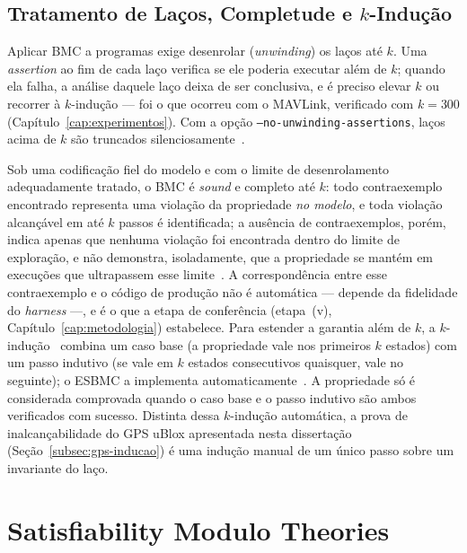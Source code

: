 \subsection{Tratamento de Laços, Completude e $k$-Indução}

Aplicar BMC a programas exige desenrolar (\textit{unwinding}) os laços até $k$.
Uma \textit{assertion} ao fim de cada laço verifica se ele poderia executar além
de $k$; quando ela falha, a análise daquele laço deixa de ser conclusiva, e é
preciso elevar $k$ ou recorrer à $k$-indução --- foi o que ocorreu com o MAVLink,
verificado com $k = 300$ (Capítulo~\ref{cap:experimentos}). Com a opção
\texttt{--no-unwinding-assertions}, laços acima de $k$ são truncados
silenciosamente~\cite{Gadelha2017}.

Sob uma codificação fiel do modelo e com o limite de desenrolamento adequadamente
tratado, o BMC é \textit{sound} e completo até $k$: todo contraexemplo encontrado
representa uma violação da propriedade \emph{no modelo}, e toda violação alcançável
em até $k$ passos é identificada; a ausência de contraexemplos, porém, indica
apenas que nenhuma violação
foi encontrada dentro do limite de exploração, e não demonstra, isoladamente, que
a propriedade se mantém em execuções que ultrapassem esse limite~\cite{Biere1999}. A correspondência entre esse contraexemplo e o código de
produção não é automática --- depende da fidelidade do \textit{harness} ---, e é o
que a etapa de conferência (etapa~(v), Capítulo~\ref{cap:metodologia})
estabelece. Para estender a garantia além de $k$, a $k$-indução~\cite{Sheeran2000}
combina um caso base (a propriedade vale nos primeiros $k$ estados) com um passo
indutivo (se vale em $k$ estados consecutivos quaisquer, vale no seguinte); o
ESBMC a implementa automaticamente~\cite{Gadelha2017}. A propriedade só é
considerada comprovada quando o caso base e o passo indutivo são ambos verificados
com sucesso. Distinta dessa $k$-indução automática, a prova de inalcançabilidade do GPS uBlox apresentada nesta
dissertação (Seção~\ref{subsec:gps-inducao}) é uma indução manual de um único
passo sobre um invariante do laço.

\section{Satisfiability Modulo Theories}
\label{sec:smt}

